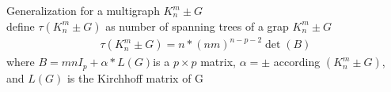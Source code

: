 	Generalization for a multigraph $K_{n}^{m} \pm G$\\
	define $\tau(K_{n}^{m} \pm G)$ as number of spanning trees of a grap $K_{n}^{m} \pm G$
	\begin{align*}
		\tau(K_{n}^{m} \pm G) = n * (nm)^{n-p-2}\det (B)
	\end{align*}
	where $B = mnI_{p} +\alpha * L(G)$is a $p\times p$ matrix, $\alpha = \pm$  according 
	$(K_{n}^{m} \pm G)$, and $L(G)$ is the Kirchhoff	matrix of G

	
	
	
	